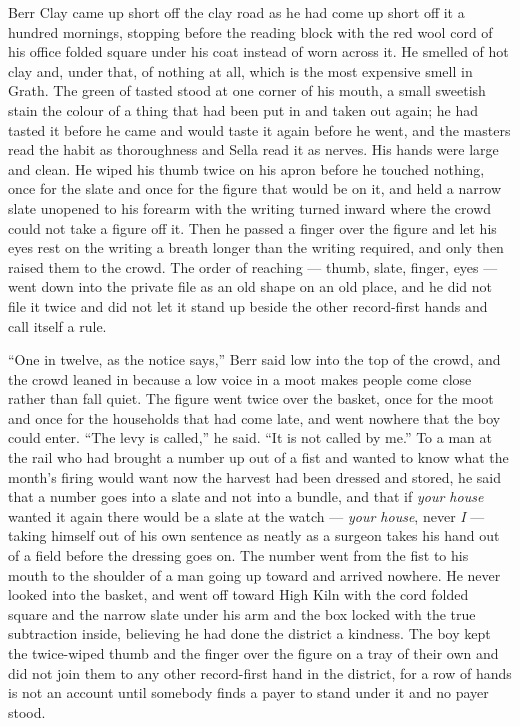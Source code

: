 Berr Clay came up short off the clay road as he had come up short off it a hundred mornings, stopping before the reading block with the red wool cord of his office folded square under his coat instead of worn across it. He smelled of hot clay and, under that, of nothing at all, which is the most expensive smell in Grath. The green of tasted  stood at one corner of his mouth, a small sweetish stain the colour of a thing that had been put in and taken out again; he had tasted it before he came and would taste it again before he went, and the masters read the habit as thoroughness and Sella read it as nerves. His hands were large and clean. He wiped his thumb twice on his apron before he touched nothing, once for the slate and once for the figure that would be on it, and held a narrow slate unopened to his forearm with the writing turned inward where the crowd could not take a figure off it. Then he passed a finger over the figure and let his eyes rest on the writing a breath longer than the writing required, and only then raised them to the crowd. The order of reaching --- thumb, slate, finger, eyes --- went down into the private file as an old shape on an old place, and he did not file it twice and did not let it stand up beside the other record-first hands and call itself a rule.

“One in twelve, as the notice says,” Berr said low into the top of the crowd, and the crowd leaned in because a low voice in a moot makes people come close rather than fall quiet. The figure went twice over the basket, once for the moot and once for the households that had come late, and went nowhere that the boy could enter. “The levy is called,” he said. “It is not called by me.” To a man at the rail who had brought a number up out of a fist and wanted to know what the month's firing would want now the harvest had been dressed and stored, he said that a number goes into a slate and not into a bundle, and that if \emph{your house} wanted it again there would be a slate at the watch --- \emph{your house}, never \emph{I} --- taking himself out of his own sentence as neatly as a surgeon takes his hand out of a field before the dressing goes on. The number went from the fist to his mouth to the shoulder of a man going up toward  and arrived nowhere. He never looked into the basket, and went off toward High Kiln with the cord folded square and the narrow slate under his arm and the box locked with the true subtraction inside, believing he had done the district a kindness. The boy kept the twice-wiped thumb and the finger over the figure on a tray of their own and did not join them to any other record-first hand in the district, for a row of hands is not an account until somebody finds a payer to stand under it and no payer stood.

